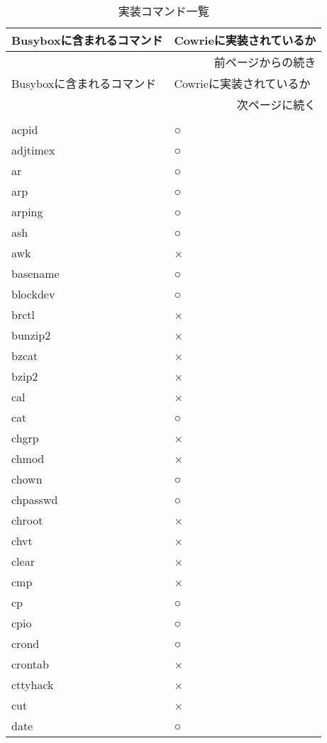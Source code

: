 \begin{longtable}{p{80mm}p{80mm}}
 \caption{実装コマンド一覧}
 \label{table:command} \\
 \hline
 Busyboxに含まれるコマンド & Cowrieに実装されているか \\ \hline\hline
 \endfirsthead
 \multicolumn{2}{r}{前ページからの続き} \\ \hline
 Busyboxに含まれるコマンド & Cowrieに実装されているか \\ \hline\hline
 \endhead
 \hline
 \multicolumn{2}{r}{次ページに続く} \\
 \endfoot
 \hline
 \multicolumn{2}{r}{以上} \\
 \endlastfoot
acpid & ○ \\ \hline
adjtimex & ○ \\ \hline
ar & ○ \\ \hline
arp & ○ \\ \hline
arping & ○ \\ \hline
ash & ○ \\ \hline
awk & × \\ \hline
basename & ○ \\ \hline
blockdev & ○ \\ \hline
brctl & × \\ \hline
bunzip2 & × \\ \hline
bzcat & × \\ \hline
bzip2 & × \\ \hline
cal & × \\ \hline
cat & ○ \\ \hline
chgrp & × \\ \hline
chmod & × \\ \hline
chown & ○ \\ \hline
chpasswd & ○ \\ \hline
chroot & × \\ \hline
chvt & × \\ \hline
clear & × \\ \hline
cmp & × \\ \hline
cp & ○ \\ \hline
cpio & ○ \\ \hline
crond & ○ \\ \hline
crontab & × \\ \hline
cttyhack & × \\ \hline
cut & × \\ \hline
date & ○ \\ \hline

\end{longtable}
